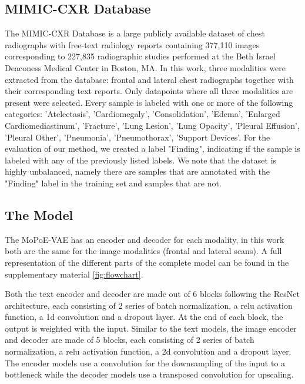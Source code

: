 \subsection{MIMIC-CXR Database}
The MIMIC-CXR Database \cite{johnson2019mimic} is a large publicly available dataset of chest radiographs with free-text radiology reports containing 377,110 images corresponding to 227,835 radiographic studies performed at the Beth Israel Deaconess Medical Center in Boston, MA.
In this work, three modalities were extracted from the database: frontal and lateral chest radiographs together with their corresponding text reports.
Only datapoints where all three modalities are present were selected.
Every sample is labeled with one or more of the following categories: 'Atelectasis', 'Cardiomegaly', 'Consolidation', 'Edema', 'Enlarged Cardiomediastinum', 'Fracture', 'Lung Lesion', 'Lung Opacity', 'Pleural Effusion', 'Pleural Other', 'Pneumonia', 'Pneumothorax', 'Support Devices'.
For the evaluation of our method, we created a label "Finding", indicating if the sample is labeled with any of the previously listed labels.
We note that the dataset is highly unbalanced, namely there are  samples that are annotated with the "Finding" label in the training set and  samples that are not.

\subsection{The Model}
The MoPoE-VAE has an encoder and decoder for each modality, in this work both are the same for the image modalities (frontal and lateral scans).
A full representation of the different parts of the complete model can be found in the supplementary material \cref{fig:flowchart}.

Both the text encoder and decoder are made out of 6 blocks following the ResNet \cite{he2016deep} architecture, each consisting of 2 series of batch normalization, a relu activation function, a 1d convolution and a dropout layer.
At the end of each block, the output is weighted with the input.
Similar to the text models, the image encoder and decoder are made of 5 blocks, each consisting of 2 series of batch normalization, a relu activation function, a 2d convolution and a dropout layer.
The encoder models use a convolution for the downsampling of the input to a bottleneck while the decoder models use a transposed convolution for upscaling.

